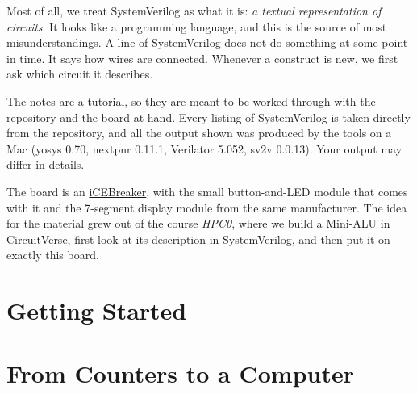 Most of all, we treat SystemVerilog as what it is: \emph{a textual
representation of circuits}. It looks like a programming language, and this is
the source of most misunderstandings. A line of SystemVerilog does not do
something at some point in time. It says how wires are connected. Whenever a
construct is new, we first ask which circuit it describes.

The notes are a tutorial, so they are meant to be worked through with the
repository and the board at hand. Every listing of SystemVerilog is taken
directly from the repository, and all the output shown was produced by the
tools on a Mac (yosys 0.70, nextpnr 0.11.1, Verilator 5.052, sv2v 0.0.13). Your
output may differ in details.

The board is an \href{https://1bitsquared.com/products/icebreaker}{iCEBreaker},
with the small button-and-LED module that comes with it and the 7-segment
display module from the same manufacturer. The idea for the material grew out
of the course \emph{HPC0}, where we build a Mini-ALU in CircuitVerse, first
look at its description in SystemVerilog, and then put it on exactly this
board.

\part{Getting Started}
\label{part:start}





\part{From Counters to a Computer}
\label{part:computer}









\appendix



